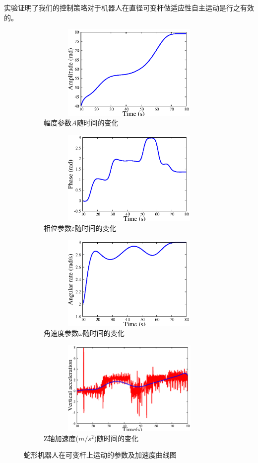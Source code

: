 实验证明了我们的控制策略对于机器人在直径可变杆做适应性自主运动是行之有效的。
\begin{figure}[htbp]
	\centering
	\begin{subfigure}{0.45\textwidth}{
			\centering
			\includegraphics[width=1\textwidth,height=130pt]{figure/chap05/BSB/a.eps}
			\caption{幅度参数$A$随时间的变化}
			\label{fig:bsa}
		}
	\end{subfigure}
	\begin{subfigure}{0.45\textwidth}{
			\centering
			\includegraphics[width=1\textwidth,height=130pt]{figure/chap05/BSB/p.eps}
			\caption{相位参数$\varepsilon$随时间的变化}
			\label{fig:bsp}
		}
	\end{subfigure}
	\begin{subfigure}{0.45\textwidth}{
			\centering
			\includegraphics[width=1\textwidth,height=130pt]{figure/chap05/BSB/w.eps}
			\caption{角速度参数$\omega$随时间的变化}
			\label{fig:bsw}
		}
	\end{subfigure}
	\begin{subfigure}{0.45\textwidth}{
			\centering
			\includegraphics[width=1\textwidth,height=130pt]{figure/chap05/BSB/v}
			\caption{Z轴加速度($m/s^2$)随时间的变化}
			\label{fig:bsv}
		}
	\end{subfigure}
	\caption{蛇形机器人在可变杆上运动的参数及加速度曲线图}
	\label{fig:BSB2}
\end{figure}


